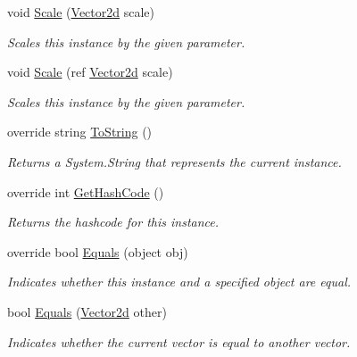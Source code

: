 \begin{DoxyCompactItemize}
void \hyperlink{struct_open_t_k_1_1_vector2d_ae10ad5814fb0786b66e5a5b17243d416}{Scale} (\hyperlink{struct_open_t_k_1_1_vector2d}{Vector2d} scale)
\begin{DoxyCompactList}\small\item\em Scales this instance by the given parameter.\end{DoxyCompactList}\item 
void \hyperlink{struct_open_t_k_1_1_vector2d_a4937f85e59ff76c22f60d3845c8ac3ed}{Scale} (ref \hyperlink{struct_open_t_k_1_1_vector2d}{Vector2d} scale)
\begin{DoxyCompactList}\small\item\em Scales this instance by the given parameter.\end{DoxyCompactList}\item 
override string \hyperlink{struct_open_t_k_1_1_vector2d_a5fa1b9e286d7d4b5b6122061367f7791}{To\-String} ()
\begin{DoxyCompactList}\small\item\em Returns a System.\-String that represents the current instance. \end{DoxyCompactList}\item 
override int \hyperlink{struct_open_t_k_1_1_vector2d_a85fe46ce348dd886d2a6faaff4ad654b}{Get\-Hash\-Code} ()
\begin{DoxyCompactList}\small\item\em Returns the hashcode for this instance. \end{DoxyCompactList}\item 
override bool \hyperlink{struct_open_t_k_1_1_vector2d_a859fe5d578bb0195d359d7be28924083}{Equals} (object obj)
\begin{DoxyCompactList}\small\item\em Indicates whether this instance and a specified object are equal. \end{DoxyCompactList}\item 
bool \hyperlink{struct_open_t_k_1_1_vector2d_a83e718d36d904b34676d6f7f1397c945}{Equals} (\hyperlink{struct_open_t_k_1_1_vector2d}{Vector2d} other)
\begin{DoxyCompactList}\small\item\em Indicates whether the current vector is equal to another vector.\end{DoxyCompactList}\end{DoxyCompactItemize}

